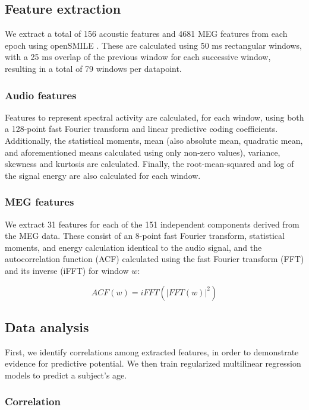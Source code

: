 \documentclass[a4paper]{article}
\begin{document}
\subsection{Feature extraction}

We extract a total of 156 acoustic features and 4681 MEG features from each epoch using openSMILE \cite{Eyben13-RDI}. These are calculated using 50 ms rectangular windows, with a 25 ms overlap of the previous window for each successive window, resulting in a total of 79 windows per datapoint.

\subsubsection{Audio features}

Features to represent spectral activity are calculated, for each window, using both a 128-point fast Fourier transform and linear predictive coding coefficients. Additionally, the statistical moments, mean (also absolute mean, quadratic mean, and aforementioned means calculated using only non-zero values), variance, skewness and kurtosis are calculated. Finally, the root-mean-squared and log of the signal energy are also calculated for each window.

\subsubsection{MEG features}

We extract 31 features for each of the 151 independent components derived from the MEG data. These consist of an 8-point fast Fourier transform, statistical moments, and energy calculation identical to the audio signal, and the autocorrelation function (ACF) calculated using the fast Fourier transform (FFT) and its inverse (iFFT) for window $w$:

\begin{equation}
  ACF(w) = iFFT(|FFT(w)|^2)
  \label{eq1}
\end{equation}

\subsection{Data analysis}

First, we identify correlations among extracted features, in order to demonstrate evidence for predictive potential. We then train regularized multilinear regression models to predict a subject's age.

\subsubsection{Correlation}
\end{document}
